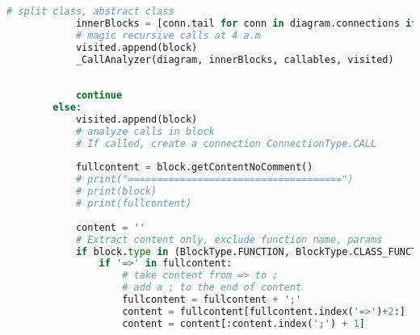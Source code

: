 \begin{lstlisting}[language=Python, caption={$\texttt{CallAnalyzer}$ function.}, label={lst:11}]
            # split class, abstract class
            innerBlocks = [conn.tail for conn in diagram.connections if conn.head == block and conn.type == ConnectionType.CONTAIN]
            # magic recursive calls at 4 a.m
            visited.append(block)
            _CallAnalyzer(diagram, innerBlocks, callables, visited)
            
            
            continue
        else:
            visited.append(block)
            # analyze calls in block
            # If called, create a connection ConnectionType.CALL
            
            fullcontent = block.getContentNoComment()
            # print("=====================================")
            # print(block)
            # print(fullcontent)
            
            content = ''
            # Extract content only, exclude function name, params
            if block.type in (BlockType.FUNCTION, BlockType.CLASS_FUNCTION):
                if '=>' in fullcontent:
                    # take content from => to ;
                    # add a ; to the end of content
                    fullcontent = fullcontent + ';'
                    content = fullcontent[fullcontent.index('=>')+2:]
                    content = content[:content.index(';') + 1]
                

\end{lstlisting}
